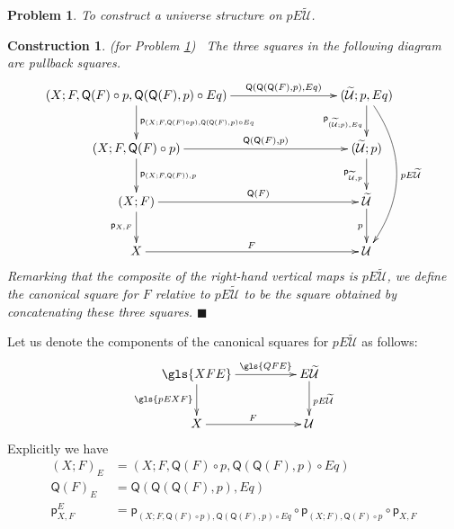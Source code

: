 \documentclass[12pt]{article}
\numberwithin{equation}{section}
\newenvironment{eq}{\begin{equation}}{\end{equation}}
\newtheorem{problem}[proposition]{Problem}
\newtheorem{construction0}[proposition]{Construction}
\newenvironment{construction}[1]{\begin{construction0}(for Problem \ref{#1})\ }{$\blacksquare$ \end{construction0}}
\newcommand{\wt}{\widetilde}
\newcommand{\p}{\mathsf{p}}
\newcommand{\U}{\mathcal{U}}
\newcommand{\Q}{\mathsf{Q}}
\begin{document}
\begin{problem}
\label{2015.05.08.prob1} To construct a universe structure on $pE\wt{\U}$.
\end{problem}
%
\begin{construction}{2015.05.08.prob1}\rm
\label{2015.05.08.constr1} The three squares in the following diagram are pullback squares.
\begin{eq}\label{pEU-diagram}
  \begin{xy}
    \xymatrix@C=7pc{
      (X;F,\Q(F)\circ p, \Q(\Q(F),p)\circ Eq)
          \ar[r]^-{\Q(\Q(\Q(F),p),Eq)}
          \ar[d]^-{\p_{(X;F,\Q(F)\circ p), \Q(\Q(F),p)\circ Eq}}                  & (\wt{\U}; p, Eq) \ar[d]_{\p_{(\wt{\U};p),Eq}} \ar@/^2pc/[ddd]^{pE\wt{\U}} \\
      (X;F,\Q(F)\circ p) 
          \ar[r]^-{\Q(\Q(F),p)} 
          \ar[d]^-{\p_{(X;F,\Q(F)), p}}                                           & (\wt{\U};p) \ar[d]_{\p_{\wt{\U},p}} \\
      (X;F) 
          \ar[r]^-{\Q(F)} 
          \ar[d]_{\p_{X,F}}                                                       & \wt{\U} \ar[d]_{p} \\
      X \ar[r]^{F}                                                                & \U
    }
  \end{xy}
\end{eq}%
Remarking that the composite of the right-hand vertical maps is $pE\wt{\U}$, we
define the canonical square for $F$ relative to $pE\wt{\U}$ to be the
square obtained by concatenating these three squares.
\end{construction}
%
Let us denote the components of the canonical squares for $pE\wt{\U}$ as
follows:
%
\begin{eq}
          \xymatrix@C=4pc{ \gls{XFE} \ar[r]^-{\gls{QFE}} \ar[d]_{\gls{pEXF}} &
            E\wt{\U} \ar[d]^{pE\wt{\U}}\\ X \ar[r]^{F} & \U }
\end{eq}
%
Explicitly we have
%
\begin{align}
  (X;F)_{E}&=(X;F,\Q(F)\circ p, \Q(\Q(F),p)\circ Eq) \\
  \Q(F)_{E}&=\Q(\Q(\Q(F),p),Eq) \label{defQFE} \\
  \p_{X,F}^E&=\p_{(X;F,\Q(F)\circ p),\Q(\Q(F),p)\circ Eq}\circ \p_{(X;F),\Q(F)\circ p}\circ \p_{X,F}
\end{align}
%
\end{document}
